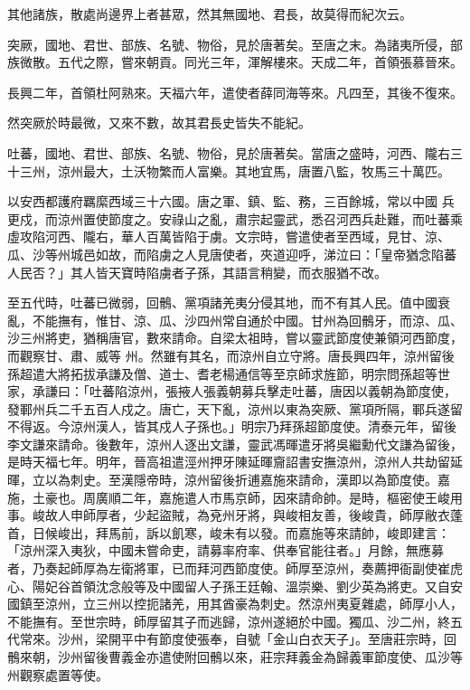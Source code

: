\begin{pinyinscope}
 其他諸族，散處尚邊界上者甚眾，然其無國地、君長，故莫得而紀次云。



 突厥，國地、君世、部族、名號、物俗，見於唐著矣。至唐之末。為諸夷所侵，部族微散。五代之際，嘗來朝貢。同光三年，渾解樓來。天成二年，首領張慕晉來。



 長興二年，首領杜阿熟來。天福六年，遣使者薛同海等來。凡四至，其後不復來。



 然突厥於時最微，又來不數，故其君長史皆失不能紀。



 吐蕃，國地、君世、部族、名號、物俗，見於唐著矣。當唐之盛時，河西、隴右三十三州，涼州最大，土沃物繁而人富樂。其地宜馬，唐置八監，牧馬三十萬匹。



 以安西都護府羈縻西域三十六國。唐之軍、鎮、監、務，三百餘城，常以中國
 兵更戍，而涼州置使節度之。安祿山之亂，肅宗起靈武，悉召河西兵赴難，而吐蕃乘虛攻陷河西、隴右，華人百萬皆陷于虜。文宗時，嘗遣使者至西域，見甘、涼、瓜、沙等州城邑如故，而陷虜之人見唐使者，夾道迎呼，涕泣曰：「皇帝猶念陷蕃人民否？」其人皆天寶時陷虜者子孫，其語言稍變，而衣服猶不改。



 至五代時，吐蕃已微弱，回鶻、黨項諸羌夷分侵其地，而不有其人民。值中國衰亂，不能撫有，惟甘、涼、瓜、沙四州常自通於中國。甘州為回鶻牙，而涼、瓜、沙三州將吏，猶稱唐官，數來請命。自梁太祖時，嘗以靈武節度使兼領河西節度，而觀察甘、肅、威等
 州。然雖有其名，而涼州自立守將。唐長興四年，涼州留後孫超遣大將拓拔承謙及僧、道士、耆老楊通信等至京師求旌節，明宗問孫超等世家，承謙曰：「吐蕃陷涼州，張掖人張義朝募兵擊走吐蕃，唐因以義朝為節度使，發鄆州兵二千五百人戍之。唐亡，天下亂，涼州以東為突厥、黨項所隔，鄆兵遂留不得返。今涼州漢人，皆其戍人子孫也。」明宗乃拜孫超節度使。清泰元年，留後李文謙來請命。後數年，涼州人逐出文謙，靈武馮暉遣牙將吳繼勳代文謙為留後，是時天福七年。明年，晉高祖遣涇州押牙陳延暉齎詔書安撫涼州，涼州人共劫留延
 暉，立以為刺史。至漢隱帝時，涼州留後折逋嘉施來請命，漢即以為節度使。嘉施，土豪也。周廣順二年，嘉施遣人市馬京師，因來請命帥。是時，樞密使王峻用事。峻故人申師厚者，少起盜賊，為兗州牙將，與峻相友善，後峻貴，師厚敝衣蓬首，日候峻出，拜馬前，訴以飢寒，峻未有以發。而嘉施等來請帥，峻即建言：「涼州深入夷狄，中國未嘗命吏，請募率府率、供奉官能往者。」月餘，無應募者，乃奏起師厚為左衛將軍，已而拜河西節度使。師厚至涼州，奏薦押衙副使崔虎心、陽妃谷首領沈念般等及中國留人子孫王廷翰、溫崇樂、劉少英為將吏。又自安
 國鎮至涼州，立三州以控扼諸羌，用其酋豪為刺史。然涼州夷夏雜處，師厚小人，不能撫有。至世宗時，師厚留其子而逃歸，涼州遂絕於中國。獨瓜、沙二州，終五代常來。沙州，梁開平中有節度使張奉，自號「金山白衣天子」。至唐莊宗時，回鶻來朝，沙州留後曹義金亦遣使附回鶻以來，莊宗拜義金為歸義軍節度使、瓜沙等州觀察處置等使。




\end{pinyinscope}
